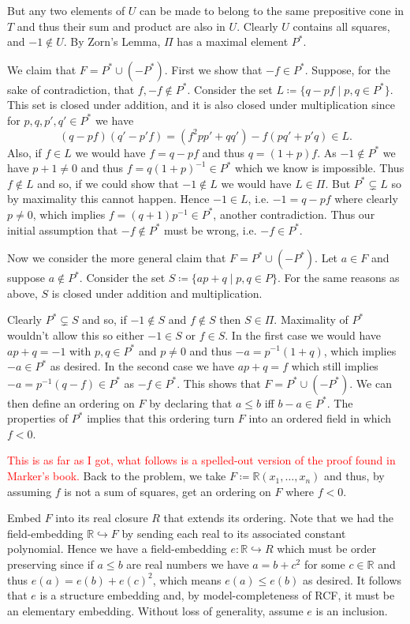 \documentclass{article}
\theoremstyle{theorem}
\begin{document}
\begin{enumerate}[leftmargin=*]
		But any two elements of $U$ can be made to belong to the same prepositive cone in $T$ and thus their sum and product are also in $U$. Clearly $U$ contains all squares, and $-1\notin U$. By Zorn's Lemma, $\Pi$ has a maximal element $P^*$.
		
		We claim that $F = P^* \cup (-P^*)$. First we show that $-f\in P^{*}$. Suppose, for the sake of contradiction, that $f,-f\notin P^{*}$. Consider the set $L \coloneqq \{q - pf \mid p,q\in P^*\}$. This set is closed under addition, and it is also closed under multiplication since for $p,q,p',q'\in P^*$ we have
		\[
			(q-pf)(q'-p'f) = (f^2pp' + qq') -f(pq' + p'q) \in L.
		\]
		Also, if $f\in L$ we would have $f = q -pf$ and thus $q = (1+p)f$. As $-1\notin P^*$ we have $p+1\neq 0$ and thus $f= q(1+p)^{-1}\in P^*$ which we know is impossible. Thus $f\notin L$ and so, if we could show that $-1\notin L$ we would have $L\in \Pi$. But $P^{*}\subsetneq L$ so by maximality this cannot happen. Hence $-1\in L$, i.e. $-1 = q - pf$ where clearly $p\neq 0$, which implies $f= (q+1)p^{-1}\in P^*$, another contradiction. Thus our initial assumption that $-f\notin P^*$ must be wrong, i.e. $-f\in P^*$.
		
		Now we consider the more general claim that $F = P^* \cup (-P^*)$. Let $a\in F$ and suppose $a\notin P^*$. Consider the set $S \coloneqq \{ap + q \mid p,q\in P\}$. For the same reasons as above, $S$ is closed under addition and multiplication. 
		
		Clearly $P^* \subsetneq S$ and so, if $-1\notin S$ and $f\notin S$ then $S\in \Pi$. Maximality of $P^*$ wouldn't allow this so either $-1\in S$ or $f\in S$. In the first case we would have $ap+q = -1$ with $p,q\in P^*$ and $p\neq 0$ and thus $-a = p^{-1}(1+q)$, which implies $-a \in P^{*}$ as desired. In the second case we have $ap+q = f$ which still implies $-a = p^{-1}(q - f)\in P^*$ as $-f\in P^*$. This shows that $F = P^* \cup (-P^*)$. We can then define an ordering on $F$ by declaring that $a\leq b$ iff $b-a\in P^*$. The properties of $P^*$ implies that this ordering turn $F$ into an ordered field in which $f < 0$.
		
		\textcolor{red}{This is as far as I got, what follows is a spelled-out version of the proof found in Marker's book.} Back to the problem, we take $F\coloneqq \mathbb{R}(x_1,\ldots,x_n)$ and thus, by assuming $f$ is not a sum of squares, get an ordering on $F$ where $f<0$.
		
		Embed $F$ into its real closure $R$ that extends its ordering. Note that we had the field-embedding $\mathbb{R} \hookrightarrow F$ by sending each real to its associated constant polynomial. Hence we have a field-embedding $e\colon \mathbb{R}\hookrightarrow R$ which must be order preserving since if $a\leq b$ are real numbers we have $a = b + c^2$ for some $c\in\mathbb{R}$ and thus $e(a) = e(b) + e(c)^2$, which means $e(a)\leq e(b)$ as desired. It follows that $e$ is a structure embedding and, by model-completeness of RCF, it must be an elementary embedding. Without loss of generality, assume $e$ is an inclusion.
		

\end{enumerate}
\end{document}
